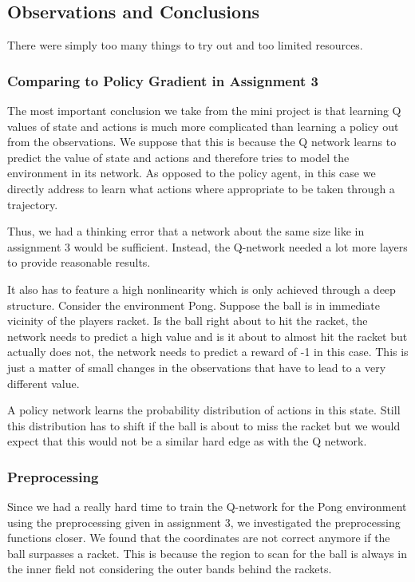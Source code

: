 \documentclass[10pt,a4paper]{article}
\begin{document}
\subsection{Observations and Conclusions}
There were simply too many things to try out and too limited resources.

\subsubsection{Comparing to Policy Gradient in Assignment 3}
The most important conclusion we take from the mini project is that learning Q values of state and actions is much more complicated than learning a policy out from the observations. We suppose that this is because the Q network learns to predict the value of state and actions and therefore tries to model the environment in its network. As opposed to the policy agent, in this case we directly address to learn what actions where appropriate to be taken through a trajectory.

Thus, we had a thinking error that a network about the same size like in assignment 3 would be sufficient. Instead, the Q-network needed a lot more layers to provide reasonable results.

It also has to feature a high nonlinearity which is only achieved through a deep structure. Consider the environment Pong. Suppose the ball is in immediate vicinity of the players racket. Is the ball right about to hit the racket, the network needs to predict a high value and is it about to almost hit the racket but actually does not, the network needs to predict a reward of -1 in this case. This is just a matter of small changes in the observations that have to lead to a very different value.

A policy network learns the probability distribution of actions in this state. Still this distribution has to shift if the ball is about to miss the racket but we would expect that this would not be a similar hard edge as with the Q network.

\subsubsection{Preprocessing}
Since we had a really hard time to train the Q-network for the Pong environment using the preprocessing given in assignment 3, we investigated the preprocessing functions closer. We found that the coordinates are not correct anymore if the ball surpasses a racket. This is because the region to scan for the ball is always in the inner field not considering the outer bands behind the rackets.
\end{document}
